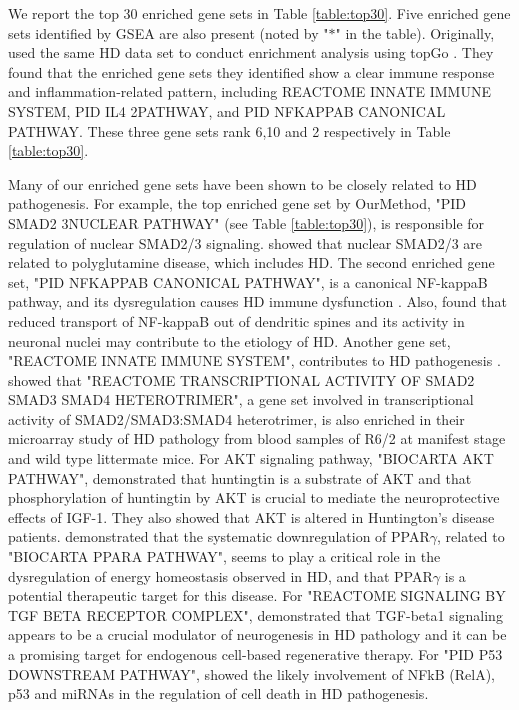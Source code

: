 \documentclass[11pt, a4paper]{article}
\begin{document}
		  We report the top 30 enriched gene sets in Table \ref{table:top30}. Five enriched gene sets identified by GSEA are also present (noted by "$\ast$" in the table). Originally, \cite{labadorf2015rna} used the same HD data set to conduct enrichment analysis using topGo \citep{alexa2010topgo}. They found that the enriched gene sets they identified show a clear immune response and inflammation-related pattern, including REACTOME INNATE IMMUNE SYSTEM, PID IL4 2PATHWAY, and PID NFKAPPAB CANONICAL PATHWAY. These three gene sets rank 6,10 and 2 respectively in Table \ref{table:top30}.
		  
		   Many of our enriched gene sets have been shown to be closely related to HD pathogenesis. For example, the top enriched gene set by OurMethod, "PID SMAD2 3NUCLEAR PATHWAY" (see Table \ref{table:top30}), is responsible for regulation of nuclear SMAD2/3 signaling. \cite{katsuno2010disrupted} showed that nuclear SMAD2/3 are related to polyglutamine disease, which includes HD. The second enriched gene set, "PID NFKAPPAB CANONICAL PATHWAY", is a canonical NF-kappaB pathway, and its dysregulation causes HD immune dysfunction \citep{trager2014htt}. Also, \cite{marcora2010huntington} found that reduced transport of NF-kappaB out of dendritic spines and its activity in neuronal nuclei may contribute to the etiology of HD. 
		    Another gene set, "REACTOME INNATE IMMUNE SYSTEM", contributes to HD pathogenesis \citep{trager2014htt, labadorf2015rna}. \cite{diamanti2013whole} showed that "REACTOME TRANSCRIPTIONAL ACTIVITY OF SMAD2 SMAD3 SMAD4 HETEROTRIMER", a gene set involved in transcriptional activity of SMAD2/SMAD3:SMAD4 heterotrimer, is also enriched in their microarray study of HD pathology from blood samples of R6/2 at manifest stage and wild type littermate mice. For AKT signaling pathway, "BIOCARTA AKT PATHWAY", \cite{humbert2002igf} demonstrated that huntingtin is a substrate of AKT and that phosphorylation of huntingtin by AKT is crucial to mediate the neuroprotective effects of IGF-1. They also showed that AKT is altered in Huntington’s disease patients.  
			\cite{chiang2010modulation} demonstrated that the systematic downregulation of PPAR$\gamma$, related to "BIOCARTA PPARA PATHWAY", seems to play a critical role in the dysregulation of energy homeostasis observed in HD, and that PPAR$\gamma$ is a potential therapeutic target for this disease. For "REACTOME SIGNALING BY TGF BETA RECEPTOR COMPLEX",  \cite{kandasamy2011transforming} demonstrated that TGF-beta1 signaling appears to be a crucial modulator of neurogenesis in HD pathology and it can be a promising target for endogenous cell-based regenerative therapy. 
		   For "PID P53 DOWNSTREAM PATHWAY", \cite{ghose2011regulation} showed the likely involvement of NFkB (RelA), p53 and miRNAs in the regulation of cell death in HD pathogenesis. 
		 	 	
\end{document}
